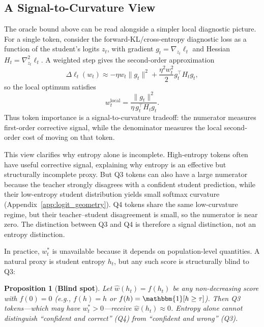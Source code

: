 \documentclass{article}
\newtheorem{proposition}[theorem]{Proposition}
\begin{document}
\subsection{A Signal-to-Curvature View}

The oracle bound above can be read alongside a simpler local diagnostic picture.
For a single token, consider the forward-KL/cross-entropy diagnostic loss as a function of the student's logits $z_t$, with gradient $g_t = \nabla_{z_t}\ell_t$ and Hessian $H_t = \nabla_{z_t}^2\ell_t$.
A weighted step gives the second-order approximation
\begin{equation}
    \Delta \ell_t(w_t)
    \approx
    -\eta w_t \|g_t\|^2
    + \frac{\eta^2 w_t^2}{2} g_t^\top H_t g_t,
    \label{eq:local_weight_expansion}
\end{equation}
so the local optimum satisfies
\begin{equation}
    w_t^{\mathrm{local}}
    = \frac{\|g_t\|^2}{\eta\, g_t^\top H_t g_t}.
    \label{eq:local_weight}
\end{equation}
Thus token importance is a signal-to-curvature tradeoff: the numerator measures first-order corrective signal, while the denominator measures the local second-order cost of moving on that token.

This view clarifies why entropy alone is incomplete.
High-entropy tokens often have useful corrective signal, explaining why entropy is an effective but structurally incomplete proxy.
But Q3 tokens can also have a large numerator because the teacher strongly disagrees with a confident student prediction, while their low-entropy student distribution yields small softmax curvature (Appendix~\ref{app:logit_geometry}).
Q4 tokens share the same low-curvature regime, but their teacher--student disagreement is small, so the numerator is near zero.
The distinction between Q3 and Q4 is therefore a signal distinction, not an entropy distinction.

In practice, $w_t^*$ is unavailable because it depends on population-level quantities.
A natural proxy is student entropy $h_t$, but any such score is structurally blind to Q3:

\begin{proposition}[\textbf{Blind spot}]
\label{prop:proxy_bias}
Let $\hat{w}(h_t) = f(h_t)$ be any non-decreasing score with $f(0) = 0$ (e.g., $f(h) = h$ or $f(h) = \mathbbm{1}[h \geq \tau]$). Then Q3 tokens---which may have $w_t^* > 0$---receive $\hat{w}(h_t) \approx 0$. Entropy alone cannot distinguish ``confident and correct'' (Q4) from ``confident and wrong'' (Q3).
\end{proposition}
\end{document}
